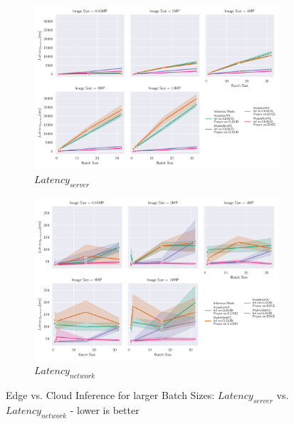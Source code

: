 \begin{figure}[!htb]
\centering
\begin{subfigure}[b]{0.95\textwidth}
   \includegraphics[width=1\linewidth]{./Bilder/single_plots/batch_size_plots/Effects_of_Batch_size_Inference_server_lat.pdf}
   \caption{$Latency_{server}$}
   \label{fig:BatchSizeServer} 
\end{subfigure}

\begin{subfigure}[b]{0.95\textwidth}
   \includegraphics[width=1\linewidth]{./Bilder/single_plots/batch_size_plots/Effects_of_Batch_size_Inference_network_lat.pdf}
   \caption{$Latency_{network}$}
   \label{fig:BatchSizeNetwork}
\end{subfigure}

\caption{Edge vs.  Cloud Inference for larger Batch Sizes:  $Latency_{server}$ vs. $Latency_{network}$ - lower is better}
\end{figure}



